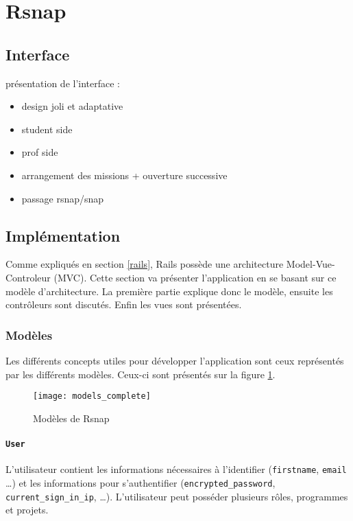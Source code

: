 \section{Rsnap}
\graphicspath{{content/7-solution/3-rsnap/images/}}

\subsection{Interface}
présentation de l'interface :
\begin{itemize}
  \item design joli et adaptative
  \item student side
  \item prof side
  \item arrangement des missions + ouverture successive
  \item passage rsnap/snap
\end{itemize}

\subsection{Implémentation}
Comme expliqués en section \ref{rails}, Rails possède une architecture Model-Vue-Controleur (MVC). Cette section va présenter l'application en se basant sur ce modèle d'architecture. La première partie explique donc le modèle, ensuite les contrôleurs sont discutés. Enfin les vues sont présentées.

\subsubsection{Modèles}
Les différents concepts utiles pour développer l'application sont ceux représentés par les différents modèles. Ceux-ci sont présentés sur la figure \ref{fig:models}.

\begin{figure}
 \begin{center}
   \texttt{[image: models\_complete]}
   \caption{Modèles de Rsnap}
   \label{fig:models}
 \end{center}
\end{figure}

\paragraph{\texttt{User}} L'utilisateur contient les informations nécessaires à l'identifier (\texttt{firstname}, \texttt{email} \ldots) et les informations pour s'authentifier (\texttt{encrypted\_password}, \texttt{current\_sign\_in\_ip}, \ldots). L'utilisateur peut posséder plusieurs rôles, programmes et projets.


